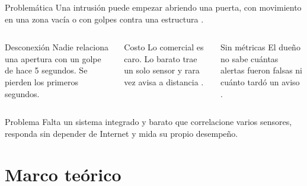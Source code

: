 \documentclass[aspectratio=169,10pt]{beamer}
\begin{document}
\begin{frame}{Problemática}
  Una intrusión puede empezar abriendo una puerta, con movimiento en una zona vacía o con golpes contra una estructura \cite{arinde2024multisensor}.
  \vspace{3mm}
  \begin{columns}[T]
    \begin{block}{Desconexión}
      Nadie relaciona una apertura con un golpe de hace 5 segundos. Se pierden los primeros segundos.
    \end{block}
    \begin{block}{Costo}
      Lo comercial es caro. Lo barato trae un solo sensor y rara vez avisa a distancia \cite{oktafiani2025esp32}.
    \end{block}
    \begin{block}{Sin métricas}
      El dueño no sabe cuántas alertas fueron falsas ni cuánto tardó un aviso \cite{pugh2015fusion}.
    \end{block}
  \end{columns}
  \vspace{3mm}
  \begin{alertblock}{Problema}
    Falta un sistema integrado y barato que correlacione varios sensores, responda sin depender de Internet y mida su propio desempeño.
  \end{alertblock}
\end{frame}

\section{Marco teórico}
\end{document}
